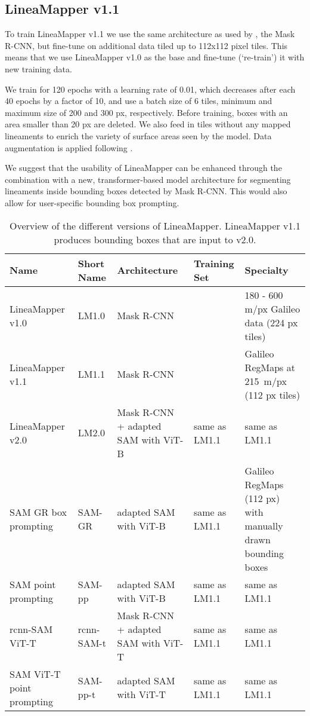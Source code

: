 \subsection{LineaMapper v1.1}\label{sec:LMv1.1}

To train LineaMapper v1.1 we use the same architecture as used by , the Mask R-CNN, but fine-tune on additional data tiled up to 112x112 pixel tiles. This means that we use LineaMapper v1.0 as the base and fine-tune (`re-train') it with new training data.

We train for 120 epochs with a learning rate of 0.01, which decreases after each 40 epochs by a factor of 10, and use a batch size of 6 tiles, minimum and maximum size of 200 and 300 px, respectively. Before training, boxes with an area smaller than 20 px are deleted. We also feed in tiles without any mapped lineaments to enrich the variety of surface areas seen by the model. Data augmentation is applied following .

We suggest that the usability of LineaMapper can be enhanced through the combination with a new, transformer-based model architecture for segmenting lineaments inside bounding boxes detected by Mask R-CNN. This would also allow for user-specific bounding box prompting.

\begin{table*}[t]
    \centering
    \caption{Overview of the different versions of LineaMapper. LineaMapper v1.1 produces bounding boxes that are input to v2.0.}
    \label{tab:Model_overviwe}
    \begin{tabular}{@{}p{2.5cm}P{2cm}p{3cm}p{2.5cm}p{4cm}@{}}
    \toprule
    \textbf{Name} & \textbf{Short Name} & \textbf{Architecture} & \textbf{Training Set} & \textbf{Specialty} \\ \midrule
    LineaMapper v1.0 & LM1.0 & Mask R-CNN & \parencite{Haslebacher2024a} & 180 - 600 m/px Galileo data (224 px tiles) \\
    LineaMapper v1.1 & LM1.1 & Mask R-CNN &  & Galileo RegMaps at 215~m/px (112 px tiles) \\
    LineaMapper v2.0 & LM2.0 & Mask R-CNN + adapted SAM with ViT-B & same as LM1.1 & same as LM1.1 \\
    SAM GR box prompting & SAM-GR & adapted SAM with ViT-B & same as LM1.1 & Galileo RegMaps (112 px) with manually drawn bounding boxes \\
    SAM point prompting & SAM-pp & adapted SAM with ViT-B & same as LM1.1 & same as LM1.1 \\
    rcnn-SAM ViT-T & rcnn-SAM-t & Mask R-CNN + adapted SAM with ViT-T & same as LM1.1 & same as LM1.1 \\
    SAM ViT-T point prompting & SAM-pp-t & adapted SAM with ViT-T & same as LM1.1 & same as LM1.1 \\ \bottomrule
    \end{tabular}
\end{table*}

